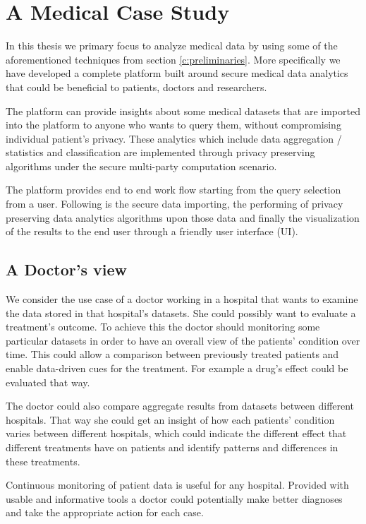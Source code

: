 \chapter{A Medical Case Study}\label{c:medical-study}

In this thesis we primary focus to analyze medical data by using some of the aforementioned techniques from section \ref{c:preliminaries}.
More specifically we have developed a complete platform built around secure medical data analytics that could be beneficial to patients, doctors and researchers.

The platform can provide insights about some medical datasets that are imported into the platform to anyone who wants to query them, without compromising individual patient's privacy.
These analytics which include data aggregation / statistics and classification are implemented through privacy preserving algorithms under the secure multi-party computation scenario.

The platform provides end to end work flow starting from the query selection from a user.
Following is the secure data importing, the performing of privacy preserving data analytics algorithms upon those data and finally the visualization of the results to the end user through a friendly user interface (UI).

\section{A Doctor's view}
We consider the use case of a doctor working in a hospital that wants to examine the data stored in that hospital's datasets.
She could possibly want to evaluate a treatment's outcome.
To achieve this the doctor should monitoring some particular datasets in order to have an overall view of the patients' condition over time.
This could allow a comparison between previously treated patients and enable data\hyp driven cues for the treatment.
For example a drug's effect could be evaluated that way.

The doctor could also compare aggregate results from datasets between different hospitals.
That way she could get an insight of how each patients' condition varies between different hospitals, which could indicate the different effect that different treatments have on patients and identify patterns
and differences in these treatments.

Continuous monitoring of patient data is useful for any hospital.
Provided with usable and informative tools a doctor could potentially make better diagnoses and take the appropriate action for each case.

